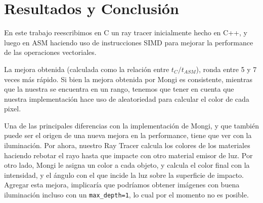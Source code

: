 \newpage
\section{Resultados y Conclusión} \label{sec:conclusion}

En este trabajo reescribimos en C un ray tracer inicialmente hecho en C++, y
luego en ASM haciendo uso de instrucciones SIMD para mejorar la performance de
las operaciones vectoriales.

La mejora obtenida (calculada como la relación entre $t_C/t_{ASM}$), ronda entre
5 y 7 veces más rápido. Si bien la mejora obtenida por Mongi es consistente,
mientras que la nuestra se encuentra en un rango, tenemos que tener en cuenta
que nuestra implementación hace uso de aleatoriedad para calcular el color de
cada pixel.

Una de las principales diferencias con la implementación de Mongi, y que también
puede ser el origen de una nueva mejora en la performance, tiene que ver con la
iluminación. Por ahora, nuestro Ray Tracer calcula los colores de los materiales
haciendo rebotar el rayo hasta que impacte con otro material emisor de luz. Por
otro lado, Mongi le asigna un color a cada objeto, y calcula el color final con
la intensidad, y el ángulo con el que incide la luz sobre la superficie de
impacto. Agregar esta mejora, implicaría que podríamos obtener imágenes con
buena iluminación incluso con un \texttt{max\_depth=1}, lo cual por el momento
no es posible.
